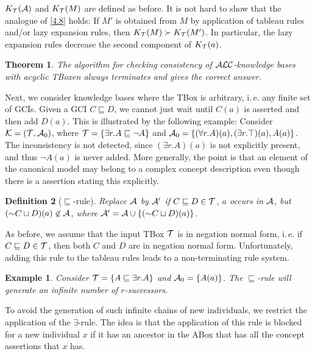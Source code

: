 \documentclass[openany]{scrbook}
\theoremstyle{break}
\newtheorem{Theorem}{Theorem}[chapter]
\newtheorem{Definition}[Theorem]{Definition}
\theoremstyle{nonumberbreak}
\newtheorem{Example}{Example}
\theoremstyle{nonumberplain}
\theoremstyle{nonumberbreak}
\newcommand{\set}[1]{\left\{#1\right\}}
\newcommand{\ie}{i{.}\,e{.}\xspace}
\newcommand{\ALC}{{\cal A}{\cal L}{\cal C}}
\newcommand{\nnf}{\mathop{\sim\!}}
\begin{document}
$K_{\cal T}({\cal A})$ and $K_{\cal T}(M)$ are defined as before. It
is not hard to show that the analogue of \cref{4.8} holds:
If $M'$ is obtained from $M$ by application of tableau rules and/or lazy
expansion rules, then $K_{\cal T}(M) \succ K_{\cal T}(M')$. In
particular, the lazy expansion rules decrease the second component of
$K_{\cal T}(a)$.

\begin{Theorem}
  \label{4.14}
  The algorithm for checking consistency of $\ALC$-knowledge bases
  with acyclic TBoxen always terminates and gives the correct answer.
\end{Theorem}

Next, we consider knowledge bases where the TBox is arbitrary, \ie any
finite set of GCIs. Given a GCI $C \sqsubseteq D$, we cannot just wait
until $C(a)$ is asserted and then add $D(a)$. This is illustrated by
the following example: Consider ${\cal K} = ({\cal T}, {\cal A}_0)$,
where ${\cal T} = \set{\exists r. A \sqsubseteq \neg A}$ and ${\cal A}_0
= \set{(\forall r. A)(a), (\exists r. \top)(a), A(a)}$. The
inconsistency is not detected, since $(\exists r.A)(a)$ is not
explicitly present, and thus $\neg A(a)$ is never added. More
generally, the point is that an element of the canonical model may
belong to a complex concept description even though there is a
assertion stating this explicitly.

\begin{Definition}[$\sqsubseteq$-rule]
  \label{4.15}
  Replace ${\cal A}$ by ${\cal A}'$ if $C \sqsubseteq D \in {\cal T}$,
  $a$ occurs in ${\cal A}$, but $(\nnf C \sqcup D)(a) \not\in {\cal
    A}$, where ${\cal A}' = {\cal A} \cup \set{(\nnf C \sqcup D)(a)}$.
\end{Definition}

As before, we assume that the input TBox ${\cal T}$ is in negation
normal form, \ie if $C \sqsubseteq D \in {\cal T}$, then both $C$ and
$D$ are in negation normal form. Unfortunately, adding this rule to
the tableau rules leads to a non-terminating rule system.

\begin{Example}
  \label{4.16}
  Consider ${\cal T} = \set{A \sqsubseteq \exists r.A}$ and ${\cal
    A}_0 = \set{A(a)}$. The $\sqsubseteq$-rule will generate an
  infinite number of $r$-successors.
\end{Example}

To avoid the generation of such infinite chains of new individuals, we
restrict the application of the $\exists$-rule. The idea is that the
application of this rule is blocked for a new individual $x$ if it has
an ancestor in the ABox that has all the concept assertions that $x$
has.
\end{document}

